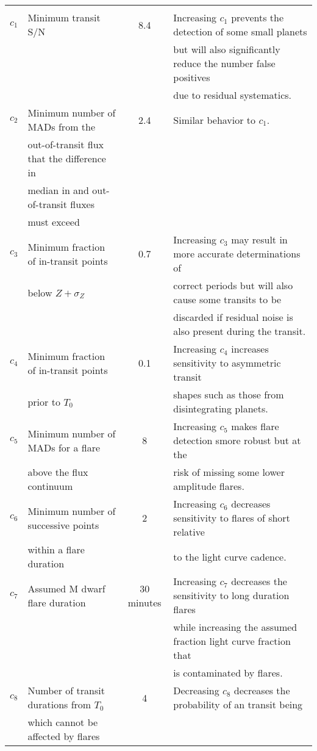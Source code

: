 \begin{landscape}
\begin{longtable}[c]{clcl}
    \hline \\
    $c_1$ & Minimum transit S/N & 8.4 & Increasing $c_1$ prevents the detection of some small planets \\
    &&& but will also significantly reduce the number false positives \\
    &&& due to residual systematics. \\
    $c_2$ & Minimum number of MADs from the & 2.4 &
    Similar behavior to $c_1$. \\
    & out-of-transit flux that the difference in && \\
    & median in and out-of-transit fluxes  && \\
    & must exceed && \\
    $c_3$ & Minimum fraction of in-transit points & 0.7 &
    Increasing $c_3$ may result in more accurate determinations of \\
    & below $Z+\sigma_Z$ &&
    correct periods but will also cause some transits to be \\
    &&& discarded if residual noise is also present during the transit.  \\
    $c_4$ & Minimum fraction of in-transit points & 0.1 &
    Increasing $c_4$ increases sensitivity to asymmetric transit \\
    & prior to $T_0$ && 
    shapes such as those from disintegrating planets. \\
    $c_5$ & Minimum number of MADs for a flare & 8 &
    Increasing $c_5$ makes flare detection smore robust but at the \\
    & above the flux continuum &&
    risk of missing some lower amplitude flares. \\
    $c_6$ & Minimum number of successive points & 2 &
    Increasing $c_6$ decreases sensitivity to flares of short relative \\
    & within a flare duration & & to the light curve cadence. \\
    $c_7$ & Assumed M dwarf flare duration & 30 minutes &
    Increasing $c_7$ decreases the sensitivity to long duration flares \\
    &&& while increasing the assumed fraction light curve fraction that \\
    &&& is contaminated by flares. \\
    $c_8$ & Number of transit durations from $T_0$ & 4 &
    Decreasing $c_8$ decreases the probability of an transit being \\
    & which cannot be affected by flares &&

\end{longtable}
\end{landscape}
